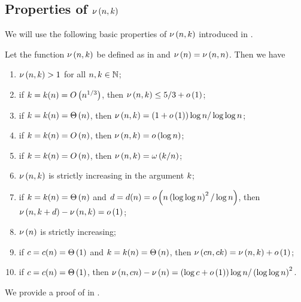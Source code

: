 \subsection[Properties of \lq concentration-function\rq]{Properties of \texorpdfstring{$\nu\left(n, k\right)$}{nu(n,k)}}
We will use the following basic properties of $\nu\left(n, k\right)$ introduced in . 
\begin{lem}\label{MDlem:nu}
Let the function $\nu\left(n, k\right)$ be defined as in  and $\nu\left(n\right)=\nu\left(n, n\right)$. Then we have
\begin{enumerate}
\item \label{MDlem:nu5} $\nu\left(n, k\right)>1$ for all $n, k \in \mathbb{N}$;
\item \label{MDlem:nu7} if $k=k(n)=O\left(n^{1/3}\right)$, then $\nu\left(n, k\right)\leq 5/3+o\left(1\right)$;
\item \label{MDlem:nu1} if $k=k(n)=\Theta\left(n\right)$, then $\nu\left(n, k\right)=\left(1+o\left(1\right)\right)\log n/\log\log n$;
\item \label{MDlem:nu8} if $k=k(n)=O\left(n\right)$, then $\nu\left(n, k\right)=o\left(\log n\right)$;
\item \label{MDlem:nu6}
if $k=k(n)=O\left(n\right)$, then $\nu\left(n, k\right)=\omega\left(k/n\right)$;
\item \label{MDlem:nu4} $\nu\left(n, k\right)$ is strictly increasing in the argument $k$;
\item \label{MDlem:nu3} if $k=k(n)=\Theta\left(n\right)$ and $d=d(n)=o\left(n\left(\log \log n\right)^2/\log n\right)$, then $\nu\left(n, k+d\right)-\nu\left(n, k\right)=o\left(1\right)$;
\item \label{MDlem:nu9} $\nu\left(n\right)$ is strictly increasing;
\item \label{MDlem:nu2} if $c=c(n)=\Theta\left(1\right)$ and $k=k(n)=\Theta\left(n\right)$, then $\nu\left(cn, ck\right)=\nu\left(n, k\right)+o\left(1\right)$;
\item \label{MDlem:nu10} if $c=c(n)=\Theta\left(1\right)$, then $\nu\left(n, cn\right)-\nu\left(n\right)=\left(\log c+o\left(1\right)\right)\log n/\left(\log \log n\right)^2$.
\end{enumerate}
\end{lem}
We provide a proof of  in .


